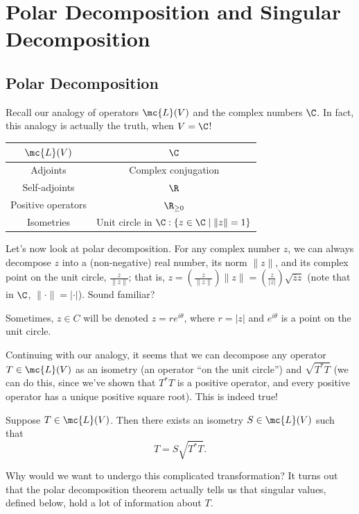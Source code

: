 \documentclass[math0540-lecture-notes.tex]{subfiles}
\begin{document}
\section{Polar Decomposition and Singular Decomposition}
\subsection{Polar Decomposition}
Recall our analogy of operators $\mc{L}(V)$ and the complex numbers $\C$. In fact, this analogy is
actually the truth, when $V=\C$!
\begin{table}[htpb]
  \centering
  \begin{tabular}{c|c}
    $\mc{L}(V)$&$\C$\\ \hline
    Adjoints & Complex conjugation\\ \hline
    Self-adjoints & $\R$\\ \hline
    Positive operators & $\R_{\ge 0}$\\ \hline
    Isometries & Unit circle in $\C: \{z\in \C\mid\|z\|=1 \} $
  \end{tabular}
\end{table}

Let's now look at polar decomposition. For any complex number $z$, we can always decompose $z$ into
a (non-negative) real number, its norm $\|z\|$, and its complex point on the unit circle,
$\frac{z}{\|z\|}$; that is, $z=(\frac{z}{\|z\|})\|z\|=(\frac{z}{\left| z \right|
})\sqrt{\overline{z}z}$ (note that in $\C$, $\|\cdot \|=\left| \cdot  \right| $). Sound familiar?

\begin{remark}
  Sometimes, $z\in C$ will be denoted $z=re^{i\theta}$, where $r=\left| z \right| $ and
  $e^{i\theta}$ is a point on the unit circle.
\end{remark}

Continuing with our analogy, it seems that we can decompose any operator $T\in \mc{L}(V)$ as an
isometry (an operator ``on the unit circle'') and $\sqrt{T^*T}$ (we can do this, since we've shown
that $T^*T$ is a positive operator, and every positive operator has a unique positive square root).
This is indeed true!
\begin{theorem}{}
  Suppose $T\in \mc{L}(V)$. Then there exists an isometry $S\in \mc{L}(V)$ such that \[
    T=S\sqrt{T^*T}
  .\] 
\end{theorem}

Why would we want to undergo this complicated transformation? It turns out that the polar
decomposition theorem actually tells us that singular values, defined below, hold a lot of
information about $T$.
\end{document}
